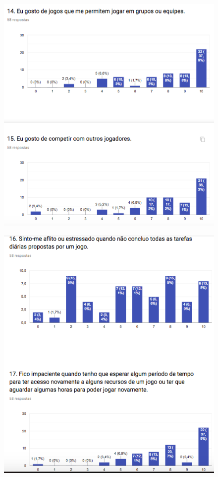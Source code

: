 \begin{apendicesenv}
\begin{figure}[h]
	\centering
	\includegraphics[keepaspectratio=true,scale=1]{figuras/r13.png}
\end{figure}


\begin{figure}[h]
	\centering
	\includegraphics[keepaspectratio=true,scale=1]{figuras/r14.png}
\end{figure}



\end{apendicesenv}
